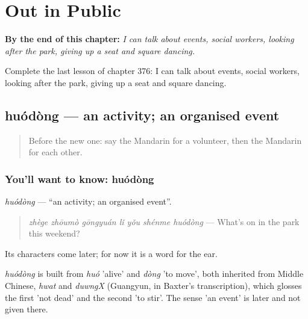
\chapter{Out in Public}
\label{ch:zh-out-in-public}

\begin{chapteropening}
\textbf{By the end of this chapter:} \emph{I can talk about events, social workers, looking after the park, giving up a seat and square dancing.}

Complete the last lesson of chapter 376: I can talk about events, social workers, looking after the park, giving up a seat and square dancing.
\end{chapteropening}

\section[huódòng]{huódòng — an activity; an organised event}

\label{lesson:ZH-C376-huodong}



\begin{quote}
Before the new one: say the Mandarin for a volunteer, then the Mandarin for each other.
\end{quote}

\subsection*{You'll want to know: huódòng}
\emph{huódòng} — \textquotedblleft{}an activity; an organised event\textquotedblright{}.

\begin{quote}
\emph{zhège zhōumò gōngyuán lǐ yǒu shénme huódòng} — What's on in the park this weekend?
\end{quote}

Its characters come later; for now it is a word for the ear.

\begin{cousinweb}
\emph{huódòng} is built from \emph{huó} 'alive' and \emph{dòng} 'to move', both inherited from Middle Chinese, \emph{hwat} and \emph{duwngX} (Guangyun, in Baxter's transcription), which glosses the first 'not dead' and the second 'to stir'. The sense 'an event' is later and not given there.
\end{cousinweb}

